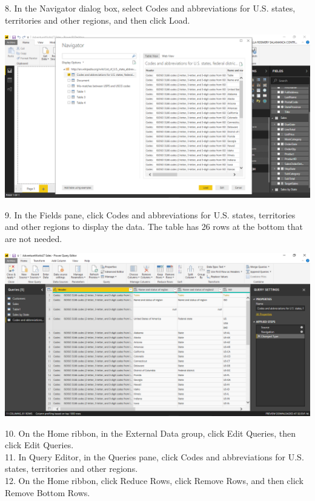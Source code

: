 8. In the Navigator dialog box, select Codes and abbreviations for U.S. states, territories and other regions, and then click Load.\\

	\begin{center}
	\includegraphics[width=17cm]{./Imagenes/Ejercicio1/Tarea4/6}
	\end{center}	

9. In the Fields pane, click Codes and abbreviations for U.S. states, territories and other regions to display the data. The table has 26 rows at the bottom that are not needed.\\

	\begin{center}
	\includegraphics[width=17cm]{./Imagenes/Ejercicio1/Tarea4/7}
	\end{center}	

10. On the Home ribbon, in the External Data group, click Edit Queries, then click Edit Queries.\\
11. In Query Editor, in the Queries pane, click Codes and abbreviations for U.S. states, territories and
other regions.\\
12. On the Home ribbon, click Reduce Rows, click Remove Rows, and then click Remove Bottom
Rows.\\

